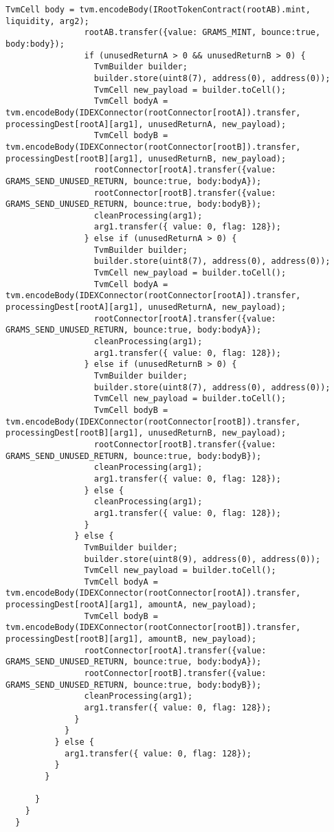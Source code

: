 \begin{lstlisting}[firstnumber=248]
                TvmCell body = tvm.encodeBody(IRootTokenContract(rootAB).mint, liquidity, arg2);
                rootAB.transfer({value: GRAMS_MINT, bounce:true, body:body});
                if (unusedReturnA > 0 && unusedReturnB > 0) {
                  TvmBuilder builder;
                  builder.store(uint8(7), address(0), address(0));
                  TvmCell new_payload = builder.toCell();
                  TvmCell bodyA = tvm.encodeBody(IDEXConnector(rootConnector[rootA]).transfer, processingDest[rootA][arg1], unusedReturnA, new_payload);
                  TvmCell bodyB = tvm.encodeBody(IDEXConnector(rootConnector[rootB]).transfer, processingDest[rootB][arg1], unusedReturnB, new_payload);
                  rootConnector[rootA].transfer({value: GRAMS_SEND_UNUSED_RETURN, bounce:true, body:bodyA});
                  rootConnector[rootB].transfer({value: GRAMS_SEND_UNUSED_RETURN, bounce:true, body:bodyB});
                  cleanProcessing(arg1);
                  arg1.transfer({ value: 0, flag: 128});
                } else if (unusedReturnA > 0) {
                  TvmBuilder builder;
                  builder.store(uint8(7), address(0), address(0));
                  TvmCell new_payload = builder.toCell();
                  TvmCell bodyA = tvm.encodeBody(IDEXConnector(rootConnector[rootA]).transfer, processingDest[rootA][arg1], unusedReturnA, new_payload);
                  rootConnector[rootA].transfer({value: GRAMS_SEND_UNUSED_RETURN, bounce:true, body:bodyA});
                  cleanProcessing(arg1);
                  arg1.transfer({ value: 0, flag: 128});
                } else if (unusedReturnB > 0) {
                  TvmBuilder builder;
                  builder.store(uint8(7), address(0), address(0));
                  TvmCell new_payload = builder.toCell();
                  TvmCell bodyB = tvm.encodeBody(IDEXConnector(rootConnector[rootB]).transfer, processingDest[rootB][arg1], unusedReturnB, new_payload);
                  rootConnector[rootB].transfer({value: GRAMS_SEND_UNUSED_RETURN, bounce:true, body:bodyB});
                  cleanProcessing(arg1);
                  arg1.transfer({ value: 0, flag: 128});
                } else {
                  cleanProcessing(arg1);
                  arg1.transfer({ value: 0, flag: 128});
                }
              } else {
                TvmBuilder builder;
                builder.store(uint8(9), address(0), address(0));
                TvmCell new_payload = builder.toCell();
                TvmCell bodyA = tvm.encodeBody(IDEXConnector(rootConnector[rootA]).transfer, processingDest[rootA][arg1], amountA, new_payload);
                TvmCell bodyB = tvm.encodeBody(IDEXConnector(rootConnector[rootB]).transfer, processingDest[rootB][arg1], amountB, new_payload);
                rootConnector[rootA].transfer({value: GRAMS_SEND_UNUSED_RETURN, bounce:true, body:bodyA});
                rootConnector[rootB].transfer({value: GRAMS_SEND_UNUSED_RETURN, bounce:true, body:bodyB});
                cleanProcessing(arg1);
                arg1.transfer({ value: 0, flag: 128});
              }
            }
          } else {
            arg1.transfer({ value: 0, flag: 128});
          }
        }

      }
    }
  }
\end{lstlisting}

